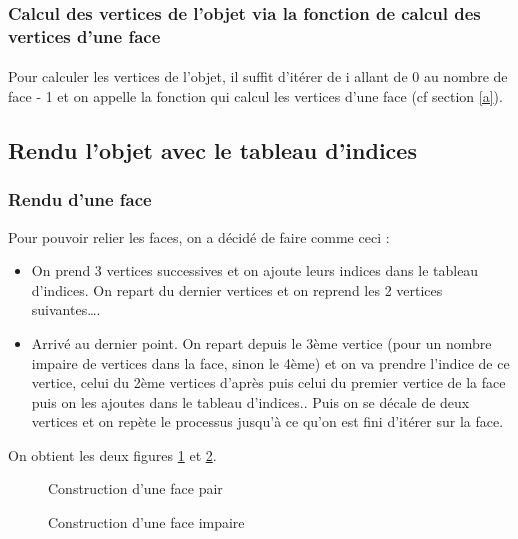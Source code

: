 \documentclass[article, backcover, french, nodocumentinfo]{upmethodology-document}
\begin{document}
	\subsubsection{Calcul des vertices de l'objet via la fonction de calcul des vertices d'une face}
	\paragraph{} Pour calculer les vertices de l'objet, il suffit d'itérer de i allant de 0 au nombre de face - 1 et on appelle la fonction qui calcul les vertices d'une face (cf section \ref{a}).
	\subsection{Rendu l'objet avec le tableau d'indices}
	\subsubsection{Rendu d'une face}
	Pour pouvoir relier les faces, on a décidé de faire comme ceci : 
	\begin{itemize}
		\item On prend 3 vertices successives et on ajoute leurs indices dans le tableau d'indices. On repart du dernier vertices et on reprend les 2 vertices suivantes\ldots.
		\item Arrivé au dernier point. On repart depuis le 3ème vertice (pour un nombre impaire de vertices dans la face, sinon le 4ème) et on va prendre l'indice de ce vertice, celui du 2ème vertices d'après puis celui du premier vertice de la face puis on les ajoutes dans le tableau d'indices.. Puis on se décale de deux vertices et on repète le processus jusqu'à ce qu'on est fini d'itérer sur la face.
	\end{itemize}
	On obtient les deux figures \ref{fig:face_1} et \ref{fig:face_2}.
	\begin{figure}[H]
			\centering%
			\caption{Construction d'une face pair}%
			\label{fig:face_1}%
	\end{figure}
	\begin{figure}[H]
			\centering%
			\caption{Construction d'une face impaire}%
			\label{fig:face_2}%
	\end{figure}
\end{document}
